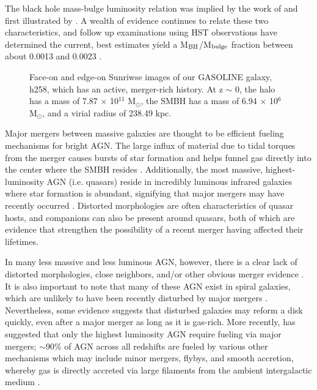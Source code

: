 \documentclass[12pt,headA,chapB]{fiskthesis}
\begin{document}
The black hole mass-bulge luminosity relation was implied by the work of \cite{Dressler1988} and first illustrated by \cite{Kormendy1993}. A wealth of evidence continues to relate these two characteristics, and follow up examinations using HST observations have determined the current, best estimates yield a M$_{\rm BH}$/M$_{\rm bulge}$ fraction between about 0.0013 and 0.0023 \citep{Merritt2001a,McLure2001,Marconi2003}. 

\begin{figure}[h]
\centerline{}
\caption[GASOLINE h258]{Face-on and edge-on Sunriwse images of our GASOLINE galaxy, h258, which has an active, merger-rich history. At z $\sim$ 0, the halo has a mass of 7.87 $\times$ 10$^{11}$ M$_{\odot}$, the SMBH has a mass of 6.94 $\times$ 10$^6$ M$_{\odot}$, and a virial radius of 238.49 kpc. }
\label{h258face} 
\end{figure}

Major mergers between massive galaxies are thought to be efficient fueling mechanisms for bright AGN. The large influx of material due to tidal torques from the merger causes bursts of star formation and helps funnel gas directly into the center where the SMBH resides \citep[e.g.][]{Richards2006,Reddy2008,Hopkins2010}. Additionally, the most massive, highest-luminosity AGN (i.e. quasars) reside in incredibly luminous infrared galaxies where star formation is abundant, signifying that major mergers may have recently occurred \citep{Treister2012}. Distorted morphologies are often characteristics of quasar hosts, and companions can also be present around quasars, both of which are evidence that strengthen the possibility of a recent merger having affected their lifetimes. 

In many less massive and less luminous AGN, however, there is a clear lack of distorted morphologies, close neighbors, and/or other obvious merger evidence \citep{Ryan2007,Schawinski2011,Ellison2013,Hicks2013}. It is also important to note that many of these AGN exist in spiral galaxies, which are unlikely to have been recently disturbed by major mergers \citep{Springel2005,Kocevski2011}. Nevertheless, some evidence suggests \citep{vanGorkom1997,Governato2009} that disturbed galaxies may reform a disk quickly, even after a major merger as long as it is gas-rich. More recently, \cite{Treister2012} has suggested that only the highest luminosity AGN require fueling via major mergers; $\sim$90\% of AGN across all redshifts are fueled by various other mechanisms which may include minor mergers, flybys, and smooth accretion, whereby gas is directly accreted via large filaments from the ambient intergalactic medium \citep{Cox2006,Bellovary2013,Sinha2012}. 
\end{document}
